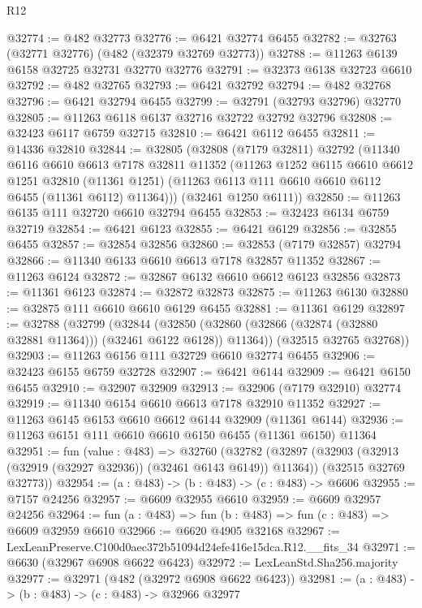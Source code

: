 \begin{lexlean}{R12}
\begin{coremodule}
@32774 := @482 @32773
@32776 := @6421 @32774 @6455
@32782 := @32763 (@32771 @32776) (@482 (@32379 @32769 @32773))
@32788 := @11263 @6139 @6158 @32725 @32731 @32770 @32776
@32791 := @32373 @6138 @32723 @6610
@32792 := @482 @32765
@32793 := @6421 @32792
@32794 := @482 @32768
@32796 := @6421 @32794 @6455
@32799 := @32791 (@32793 @32796) @32770
@32805 := @11263 @6118 @6137 @32716 @32722 @32792 @32796
@32808 := @32423 @6117 @6759 @32715
@32810 := @6421 @6112 @6455
@32811 := @14336 @32810
@32844 := @32805
    (@32808
      (@7179 @32811)
      @32792
      (@11340
        @6116
        @6610
        @6613
        @7178
        @32811
        @11352
        (@11263
          @1252
          @6115
          @6610
          @6612
          @1251
          @32810
          (@11361 @1251)
          (@11263 @6113 @111 @6610 @6610 @6112 @6455 (@11361 @6112) @11364)))
      (@32461 @1250 @6111))
@32850 := @11263 @6135 @111 @32720 @6610 @32794 @6455
@32853 := @32423 @6134 @6759 @32719
@32854 := @6421 @6123
@32855 := @6421 @6129
@32856 := @32855 @6455
@32857 := @32854 @32856
@32860 := @32853 (@7179 @32857) @32794
@32866 := @11340 @6133 @6610 @6613 @7178 @32857 @11352
@32867 := @11263 @6124
@32872 := @32867 @6132 @6610 @6612 @6123 @32856
@32873 := @11361 @6123
@32874 := @32872 @32873
@32875 := @11263 @6130
@32880 := @32875 @111 @6610 @6610 @6129 @6455
@32881 := @11361 @6129
@32897 := @32788
    (@32799
      (@32844
        (@32850 (@32860 (@32866 (@32874 (@32880 @32881 @11364))) (@32461 @6122 @6128)) @11364))
      (@32515 @32765 @32768))
@32903 := @11263 @6156 @111 @32729 @6610 @32774 @6455
@32906 := @32423 @6155 @6759 @32728
@32907 := @6421 @6144
@32909 := @6421 @6150 @6455
@32910 := @32907 @32909
@32913 := @32906 (@7179 @32910) @32774
@32919 := @11340 @6154 @6610 @6613 @7178 @32910 @11352
@32927 := @11263 @6145 @6153 @6610 @6612 @6144 @32909 (@11361 @6144)
@32936 := @11263 @6151 @111 @6610 @6610 @6150 @6455 (@11361 @6150) @11364
@32951 := fun (value : @483) =>
  @32760
    (@32782
      (@32897 (@32903 (@32913 (@32919 (@32927 @32936)) (@32461 @6143 @6149)) @11364))
      (@32515 @32769 @32773))
@32954 := (a : @483) -> (b : @483) -> (c : @483) -> @6606
@32955 := @7157 @24256
@32957 := @6609 @32955 @6610
@32959 := @6609 @32957 @24256
@32964 := fun (a : @483) => fun (b : @483) => fun (c : @483) => @6609 @32959 @6610
@32966 := @6620 @4905 @32168
@32967 := LexLeanPreserve.C100d0aec372b51094d24efe416e15dca.R12.__fits_34
@32971 := @6630 (@32967 @6908 @6622 @6423)
@32972 := LexLeanStd.Sha256.majority
@32977 := @32971 (@482 (@32972 @6908 @6622 @6423))
@32981 := (a : @483) -> (b : @483) -> (c : @483) -> @32966 @32977

\end{coremodule}
\end{lexlean}
